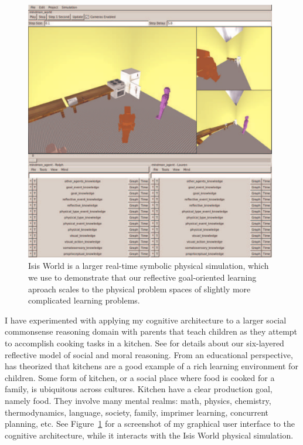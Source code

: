 \begin{figure}[bth]
  \center
  \includegraphics[width=11cm]{gfx/mindmon-isis_world-screenshot-1}
  \caption[Isis World is a larger physical simulation than the Blocks
    World toy problem.]{Isis World is a larger real-time symbolic
    physical simulation, which we use to demonstrate that our
    reflective goal-oriented learning aproach scales to the physical
    problem spaces of slightly more complicated learning problems.}
  \label{fig:mindmon-isis_world-screenshot-1}
\end{figure}

I have experimented with applying my cognitive architecture to a
larger social commonsense reasoning domain with parents that teach
children as they attempt to accomplish cooking tasks in a kitchen.
See \cite{morgan:2011} for details about our six-layered reflective
model of social and moral reasoning.  From an educational perspective,
\cite{dewey:1907} has theorized that kitchens are a good example of a
rich learning environment for children.  Some form of kitchen, or a
social place where food is cooked for a family, is ubiquitous across
cultures.  Kitchen have a clear production goal, namely food.  They
involve many mental realms: math, physics, chemistry, thermodynamics,
language, society, family, imprimer learning, concurrent planning,
etc.  See Figure~\ref{fig:mindmon-isis_world-screenshot-1} for a
screenshot of my graphical user interface to the cognitive
architecture, while it interacts with the Isis World physical
simulation.

